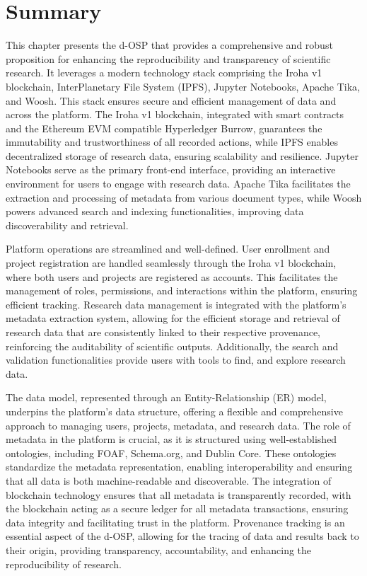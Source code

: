 \documentclass[final]{rc-book-2.14}
\begin{document}
\section{Summary}
\label{chp:proposed_model:sec:summary}

This chapter presents the d-OSP that provides a comprehensive and robust proposition for enhancing the reproducibility and transparency of scientific research. It leverages a modern technology stack comprising the Iroha v1 blockchain, InterPlanetary File System (IPFS), Jupyter Notebooks, Apache Tika, and Woosh. This stack ensures secure and efficient management of data and across the platform. The Iroha v1 blockchain, integrated with smart contracts and the Ethereum EVM compatible Hyperledger Burrow, guarantees the immutability and trustworthiness of all recorded actions, while IPFS enables decentralized storage of research data, ensuring scalability and resilience. Jupyter Notebooks serve as the primary front-end interface, providing an interactive environment for users to engage with research data. Apache Tika facilitates the extraction and processing of metadata from various document types, while Woosh powers advanced search and indexing functionalities, improving data discoverability and retrieval.

Platform operations are streamlined and well-defined. User enrollment and project registration are handled seamlessly through the Iroha v1 blockchain, where both users and projects are registered as accounts. This facilitates the management of roles, permissions, and interactions within the platform, ensuring efficient tracking. Research data management is integrated with the platform's metadata extraction system, allowing for the efficient storage and retrieval of research data that are consistently linked to their respective provenance, reinforcing the auditability of scientific outputs. Additionally, the search and validation functionalities provide users with tools to find, and explore research data.

The data model, represented through an Entity-Relationship (ER) model, underpins the platform's data structure, offering a flexible and comprehensive approach to managing users, projects, metadata, and research data. The role of metadata in the platform is crucial, as it is structured using well-established ontologies, including FOAF, Schema.org, and Dublin Core. These ontologies standardize the metadata representation, enabling interoperability and ensuring that all data is both machine-readable and discoverable. The integration of blockchain technology ensures that all metadata is transparently recorded, with the blockchain acting as a secure ledger for all metadata transactions, ensuring data integrity and facilitating trust in the platform. Provenance tracking is an essential aspect of the d-OSP, allowing for the tracing of data and results back to their origin, providing transparency, accountability, and enhancing the reproducibility of research.
\end{document}
